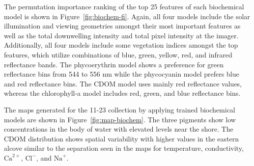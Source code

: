 \documentclass[remotesensing,article,submit,pdftex,moreauthors]{Definitions/mdpi}
\begin{document}
The permutation importance ranking of the top 25 features of each biochemical model is shown in Figure~\ref{fig:biochem-fi}. Again, all four models include the solar illumination and viewing geometries amongst their most important features as well as the total downwelling intensity and total pixel intensity at the imager. Additionally, all four models include some vegetation indices amongst the top features, which utilize combinations of blue, green, yellow, red, and infrared reflectance bands. The phycoerythrin model shows a preference for green reflectance bins from 544 to 556 nm while the phycocyanin model prefers blue and red reflectance bins. The CDOM model uses mainly red reflectance values, whereas the chlorophyll-a model includes red, green, and blue reflectance bins.

The maps generated for the 11-23 collection by applying trained biochemical models are shown in Figure~\ref{fig:map-biochem}. The three pigments show low concentrations in the body of water with elevated levels near the shore. The CDOM distribution shows spatial variability with higher values in the eastern alcove similar to the separation seen in the maps for temperature, conductivity, $\textrm{Ca}^{2+}$, $\textrm{Cl}^{-}$, and $\textrm{Na}^{+}$.
\end{document}

